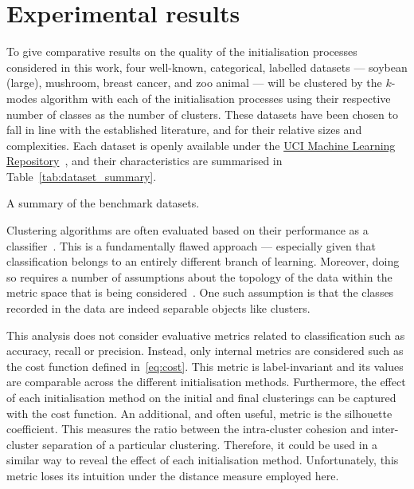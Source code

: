\section{Experimental results}\label{sec:results}

To give comparative results on the quality of the initialisation processes 
considered in this work, four well-known, categorical, labelled datasets ---
soybean (large), mushroom, breast cancer, and zoo animal --- will be clustered
by the \(k\)-modes algorithm with each of the initialisation processes using
their respective number of classes as the number of clusters. These datasets
have been chosen to fall in line with the established literature, and for their
relative sizes and complexities. Each dataset is openly available under the
\href{http://mlr.cs.umass.edu/ml/}{UCI Machine Learning
Repository}~\cite{Dua2019}, and their characteristics are summarised in
Table~\ref{tab:dataset_summary}.

\begin{table}[htbp]
    \resizebox{\textwidth}{!}{%
        
    }\caption{A summary of the benchmark datasets.}\label{tab:dataset_summary}
\end{table}

Clustering algorithms are often evaluated based on their performance as a
classifier~\cite{%
    Arthur2007,Cao2009,Cao2012,Huang1998,Ng2007,Olaode2014,Schaeffer2007%
}. This is a fundamentally flawed approach --- especially given that
classification belongs to an entirely different branch of learning. Moreover,
doing so requires a number of assumptions about the topology of the data within
the metric space that is being considered~\cite{Memoli2011}. One such assumption
is that the classes recorded in the data are indeed separable objects like
clusters.

This analysis does not consider evaluative metrics related to classification
such as accuracy, recall or precision. Instead, only internal metrics are
considered such as the cost function defined in~\eqref{eq:cost}. This metric is
label-invariant and its values are comparable across the different
initialisation methods. Furthermore, the effect of each initialisation method on
the initial and final clusterings can be captured with the cost function. An
additional, and often useful, metric is the silhouette coefficient. This
measures the ratio between the intra-cluster cohesion and inter-cluster
separation of a particular clustering. Therefore, it could be used in a similar
way to reveal the effect of each initialisation method. Unfortunately, this
metric loses its intuition under the distance measure employed here.\

